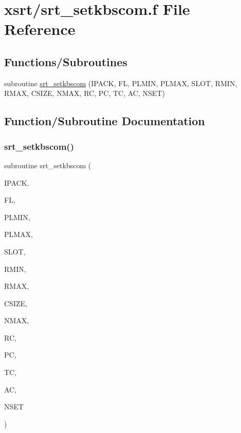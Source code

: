 \hypertarget{srt__setkbscom_8f}{}\section{xsrt/srt\+\_\+setkbscom.f File Reference}
\label{srt__setkbscom_8f}
\subsection*{Functions/\+Subroutines}
\begin{DoxyCompactItemize}
\item 
subroutine \hyperlink{srt__setkbscom_8f_af1e3d3f166eef5ae8414e8ef2b115608}{srt\+\_\+setkbscom} (I\+P\+A\+CK, FL, P\+L\+M\+IN, P\+L\+M\+AX, S\+L\+OT, R\+M\+IN, R\+M\+AX, C\+S\+I\+ZE, N\+M\+AX, RC, PC, TC, AC, N\+S\+ET)
\end{DoxyCompactItemize}


\subsection{Function/\+Subroutine Documentation}
\mbox{\label{srt__setkbscom_8f_af1e3d3f166eef5ae8414e8ef2b115608}} 
\subsubsection{\texorpdfstring{srt\+\_\+setkbscom()}{srt\_setkbscom()}}
{\footnotesize\ttfamily subroutine srt\+\_\+setkbscom (\begin{DoxyParamCaption}\item[{integer}]{I\+P\+A\+CK,  }\item[{double precision}]{FL,  }\item[{double precision}]{P\+L\+M\+IN,  }\item[{double precision}]{P\+L\+M\+AX,  }\item[{double precision}]{S\+L\+OT,  }\item[{double precision}]{R\+M\+IN,  }\item[{double precision}]{R\+M\+AX,  }\item[{double precision}]{C\+S\+I\+ZE,  }\item[{integer}]{N\+M\+AX,  }\item[{double precision, dimension(nmax)}]{RC,  }\item[{double precision, dimension(nmax)}]{PC,  }\item[{double precision, dimension(nmax)}]{TC,  }\item[{double precision, dimension(nmax)}]{AC,  }\item[{integer}]{N\+S\+ET }\end{DoxyParamCaption})}

